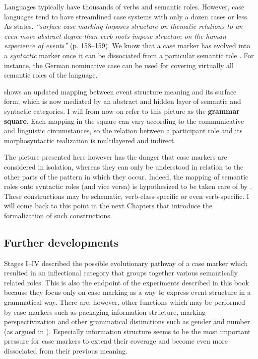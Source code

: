 Languages typically have thousands of verbs and semantic roles. However, case languages tend to have streamlined case systems with only a dozen cases or less. As \citet{croft91syntactic} states, {\em ``surface case marking imposes structure on thematic relations to an even more abstract degree than verb roots impose structure on the human experience of events''} (p. 158--159). We know that a case marker has evolved into a {\em syntactic} marker once it can be dissociated from a particular semantic role \citep[2--3]{givon97introduction}. For instance, the German nominative case can be used for covering virtually all semantic roles of the language. 

 shows an updated mapping between event structure meaning and its surface form, which is now mediated by an abstract and hidden layer of semantic and syntactic categories. I will from now on refer to this picture as the {\bfseries grammar square}. Each mapping in the square can vary according to the communicative and linguistic circumstances, so the relation between a participant role and its morphosyntactic realization is multilayered and indirect.

The picture presented here however has the danger that case markers are considered in isolation, whereas they can only be understood in relation to the other parts of the pattern in which they occur. Indeed, the mapping of semantic roles onto syntactic roles (and vice versa) is hypothesized to be taken care of by  \citep{goldberg95construction}. These constructions may be schematic, verb-class-specific or even verb-specific. I will come back to this point in the next Chapters that introduce the formalization of such constructions.

\subsection{Further developments}
\label{s:case-markers}

\largerpage
Stages I--IV described the possible evolutionary pathway of a case marker which resulted in an inflectional category that groups together various semantically related roles. This is also the endpoint of the experiments described in this book because they focus only on case marking as a way to express event structure in a grammatical way. There are, however, other functions which may be performed by case markers such as packaging information structure, marking perspectivization and other grammatical distinctions such as gender and number (as argued in ). Especially information structure seems to be the most important pressure for case markers to extend their coverage and become even more dissociated from their previous meaning.

